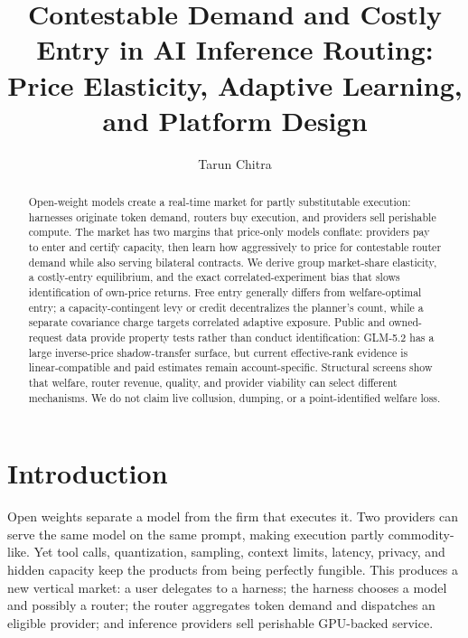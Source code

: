 \documentclass[sigconf,nonacm]{acmart}
\newcommand{\1}{\mathbf 1}
\begin{document}
\title{Contestable Demand and Costly Entry in AI Inference Routing:\\
Price Elasticity, Adaptive Learning, and Platform Design}

\author{Tarun Chitra}

\begin{abstract}
Open-weight models create a real-time market for partly substitutable execution:
harnesses originate token demand, routers buy execution, and providers sell
perishable compute.  The market has two margins that price-only models conflate:
providers pay to enter and certify capacity, then learn how aggressively to
price for contestable router demand while also serving bilateral contracts.  We
derive group market-share elasticity, a costly-entry equilibrium, and the exact
correlated-experiment bias that slows identification of own-price returns.  Free
entry generally differs from welfare-optimal entry; a capacity-contingent levy
or credit decentralizes the planner's count, while a separate covariance charge
targets correlated adaptive exposure.  Public and owned-request data provide
property tests rather than conduct identification: GLM-5.2 has a large
inverse-price shadow-transfer surface, but current effective-rank evidence is
linear-compatible and paid estimates remain account-specific.  Structural
screens show that welfare, router revenue, quality, and provider viability can
select different mechanisms.  We do not claim live collusion, dumping, or a
point-identified welfare loss.
\end{abstract}

\maketitle

\section{Introduction}

Open weights separate a model from the firm that executes it.  Two providers
can serve the same model on the same prompt, making execution partly
commodity-like.  Yet tool calls, quantization, sampling, context limits,
latency, privacy, and hidden capacity keep the products from being perfectly
fungible.  This produces a new vertical market: a user delegates to a harness;
the harness chooses a model and possibly a router; the router aggregates token
demand and dispatches an eligible provider; and inference providers sell
perishable GPU-backed service.
\end{document}
